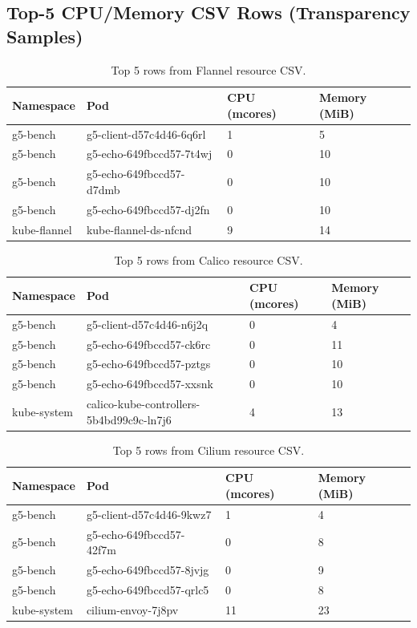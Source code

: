\documentclass[12pt,a4paper]{article}
\begin{document}
\subsection{Top-5 CPU/Memory CSV Rows (Transparency Samples)}
\begin{table}[H]
\centering
\small
\caption{Top 5 rows from Flannel resource CSV.}
\begin{tabular}{llll}
\toprule
Namespace & Pod & CPU (mcores) & Memory (MiB) \\
\midrule
g5-bench & g5-client-d57c4d46-6q6rl & 1 & 5 \\
g5-bench & g5-echo-649fbccd57-7t4wj & 0 & 10 \\
g5-bench & g5-echo-649fbccd57-d7dmb & 0 & 10 \\
g5-bench & g5-echo-649fbccd57-dj2fn & 0 & 10 \\
kube-flannel & kube-flannel-ds-nfcnd & 9 & 14 \\
\bottomrule
\end{tabular}
\end{table}

\begin{table}[H]
\centering
\small
\caption{Top 5 rows from Calico resource CSV.}
\begin{tabular}{llll}
\toprule
Namespace & Pod & CPU (mcores) & Memory (MiB) \\
\midrule
g5-bench & g5-client-d57c4d46-n6j2q & 0 & 4 \\
g5-bench & g5-echo-649fbccd57-ck6rc & 0 & 11 \\
g5-bench & g5-echo-649fbccd57-pztgs & 0 & 10 \\
g5-bench & g5-echo-649fbccd57-xxsnk & 0 & 10 \\
kube-system & calico-kube-controllers-5b4bd99c9c-ln7j6 & 4 & 13 \\
\bottomrule
\end{tabular}
\end{table}

\begin{table}[H]
\centering
\small
\caption{Top 5 rows from Cilium resource CSV.}
\begin{tabular}{llll}
\toprule
Namespace & Pod & CPU (mcores) & Memory (MiB) \\
\midrule
g5-bench & g5-client-d57c4d46-9kwz7 & 1 & 4 \\
g5-bench & g5-echo-649fbccd57-42f7m & 0 & 8 \\
g5-bench & g5-echo-649fbccd57-8jvjg & 0 & 9 \\
g5-bench & g5-echo-649fbccd57-qrlc5 & 0 & 8 \\
kube-system & cilium-envoy-7j8pv & 11 & 23 \\
\bottomrule
\end{tabular}
\end{table}
\end{document}
